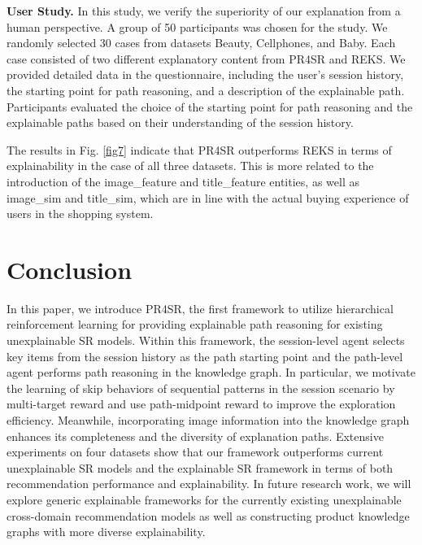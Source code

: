 \documentclass[10pt,journal,compsoc]{IEEEtran}
\begin{document}
\textbf{User Study.} 
In this study, we verify the superiority of our explanation from a human perspective. A group of 50 participants was chosen for the study. We randomly selected 30 cases from datasets Beauty, Cellphones, and Baby. Each case consisted of two different explanatory content from PR4SR and  REKS. We provided detailed data in the questionnaire, including the user’s session history, the starting point for path reasoning, and a description of the explainable path. Participants evaluated the choice of the starting point for path reasoning and the explainable paths based on their understanding of the session history.
 
The results in Fig. \ref{fig7} indicate that PR4SR outperforms REKS in terms of explainability in the case of all three datasets. This is more related to the introduction of the image\_feature and title\_feature entities, as well as image\_sim and title\_sim, which are in line with the actual buying experience of users in the shopping system.

\section{Conclusion}
In this paper, we introduce PR4SR, the first framework to utilize hierarchical reinforcement learning for providing explainable path reasoning for existing unexplainable SR models. Within this framework, the session-level agent selects key items from the session history as the path starting point and the path-level agent performs path reasoning in the knowledge graph. In particular, we motivate the learning of skip behaviors of sequential patterns in the session scenario by multi-target reward and use path-midpoint reward to improve the exploration efficiency. Meanwhile, incorporating image information into the knowledge graph enhances its completeness and the diversity of explanation paths. Extensive experiments on four datasets show that our framework outperforms current unexplainable SR models and the explainable SR framework in terms of both recommendation performance and explainability. In future research work, we will explore generic explainable frameworks for the currently existing unexplainable cross-domain recommendation models as well as constructing product knowledge graphs with more diverse explainability.
\end{document}
